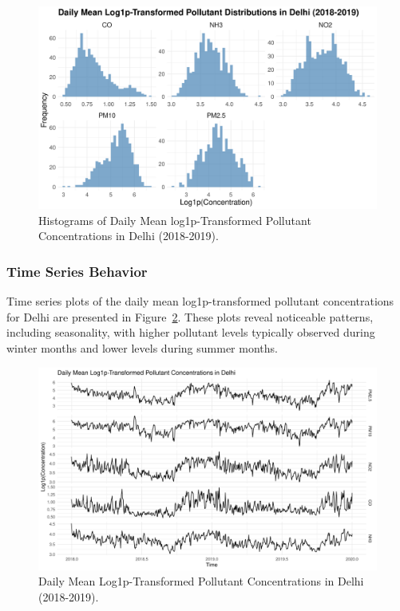 \documentclass[fleqn,10pt]{SelfArx} %
\begin{document}
\begin{figure}[ht]
    \centering
    \includegraphics[width=\linewidth]{../analysis/assets/log1p_delhi_distributions.png}
    \caption{Histograms of Daily Mean log1p-Transformed Pollutant Concentrations in Delhi (2018-2019).}
    \label{fig:log_dist_delhi}
\end{figure}

\subsubsection{Time Series Behavior}
Time series plots of the daily mean log1p-transformed pollutant concentrations for Delhi are presented in Figure~\ref{fig:daily_ts_delhi}. These plots reveal noticeable patterns, including seasonality, with higher pollutant levels typically observed during winter months and lower levels during summer months.

\begin{figure}[ht]
    \centering
    \includegraphics[width=\linewidth]{../analysis/assets/daily_ts_delhi.png}
    \caption{Daily Mean Log1p-Transformed Pollutant Concentrations in Delhi (2018-2019).}
    \label{fig:daily_ts_delhi}
\end{figure}
\end{document}

